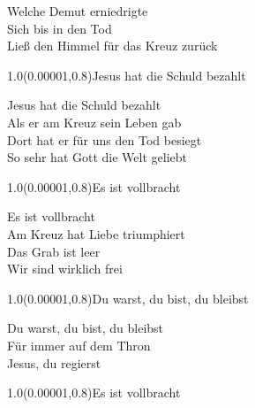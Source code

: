 \documentclass[aspectratio=169]{beamer}
\begin{document}
\begin{frame}
\centering
\color{white}
\huge{Welche Demut erniedrigte} \\
\huge{Sich bis in den Tod} \\
\huge{Ließ den Himmel für das Kreuz zurück} \\

\begin{textblock}{1.0}(0.00001,0.8)\color{gray}\normalsize{Jesus hat die Schuld bezahlt}\end{textblock}
\end{frame}

\begin{frame}
\centering
\color{white}
\huge{Jesus hat die Schuld bezahlt} \\
\huge{Als er am Kreuz sein Leben gab} \\
\huge{Dort hat er für uns den Tod besiegt} \\
\huge{So sehr hat Gott die Welt geliebt} \\

\begin{textblock}{1.0}(0.00001,0.8)\color{gray}\normalsize{Es ist vollbracht}\end{textblock}
\end{frame}

\begin{frame}
\centering
\color{white}
\huge{Es ist vollbracht} \\
\huge{Am Kreuz hat Liebe triumphiert} \\
\huge{Das Grab ist leer} \\
\huge{Wir sind wirklich frei} \\

\begin{textblock}{1.0}(0.00001,0.8)\color{gray}\normalsize{Du warst, du bist, du bleibst}\end{textblock}
\end{frame}

\begin{frame}
\centering
\color{white}
\huge{Du warst, du bist, du bleibst} \\
\huge{Für immer auf dem Thron} \\
\huge{Jesus, du regierst} \\

\begin{textblock}{1.0}(0.00001,0.8)\color{gray}\normalsize{Es ist vollbracht}\end{textblock}
\end{frame}
\end{document}
